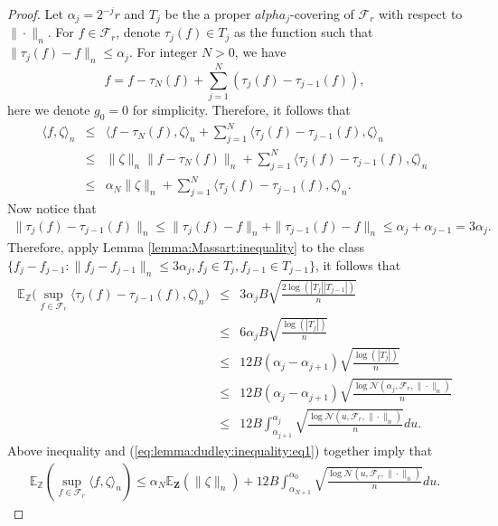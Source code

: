 \documentclass[11pt, preprint]{imsart}
\numberwithin{equation}{section}
\def \mcF{\mathcal{F}}
\def \mcN{\mathcal{N}}
\def \bfZ{\mathbf{Z}}
\def \ev{\mathbb{E}}
\theoremstyle{plain}
\theoremstyle{definition}
\begin{document}
\begin{proof}
Let $\alpha_j=2^{-j}r$ and $T_j$ be the a proper $alpha_j$-covering of $\mcF_r$ with respect to $\|\cdot\|_n$. For $f\in \mcF_r$, denote $\tau_j(f)\in T_j$ as the function such that $\|\tau_j(f)-f\|_n\leq \alpha_j$. For integer $N>0$, we have
\begin{equation*}
	f=f-\tau_N(f)+\sum_{j=1}^N(\tau_j(f)-\tau_{j-1}(f)),
\end{equation*}
here we denote $g_0=0$ for simplicity. Therefore, it follows that
\begin{eqnarray}
	\langle f, \zeta \rangle_n&\leq&	\langle f-\tau_N(f), \zeta \rangle_n+\sum_{j=1}^N \langle \tau_j(f)-\tau_{j-1}(f), \zeta \rangle_n\nonumber\\
	&\leq& \|\zeta\|_n \|f-\tau_N(f)\|_n+\sum_{j=1}^N \langle \tau_j(f)-\tau_{j-1}(f), \zeta \rangle_n\nonumber\\
	&\leq&  \alpha_N\|\zeta\|_n+\sum_{j=1}^N \langle \tau_j(f)-\tau_{j-1}(f), \zeta \rangle_n. \label{eq:lemma:dudley:inequality:eq1}
\end{eqnarray}
Now notice that
\begin{eqnarray*}
	\|\tau_j(f)-\tau_{j-1}(f)\|_n\leq \|\tau_j(f)-f\|_n+\|\tau_{j-1}(f)-f\|_n\leq \alpha_j+\alpha_{j-1}= 3\alpha_j.
\end{eqnarray*}
Therefore, apply  Lemma \ref{lemma:Massart:inequality} to the class $\{f_j-f_{j-1}: \|f_j-f_{j-1}\|_n\leq 3\alpha_j, f_j\in T_j, f_{j-1}\in T_{j-1}\}$, it follows that
\begin{eqnarray}
	\ev_{\mathbb{Z}}\bigg(\sup_{f\in \mcF_r}\langle \tau_j(f)-\tau_{j-1}(f), \zeta \rangle_n\bigg)&\leq&   3\alpha_j B\sqrt{\frac{2\log(|T_j||T_{j-1}|)}{n}}\nonumber\\
	&\leq& 6\alpha_j B\sqrt{\frac{\log(|T_j|)}{n}}\nonumber\\
	&\leq& 12B(\alpha_j-\alpha_{j+1})\sqrt{\frac{\log(|T_j|)}{n}}\nonumber\\
	&\leq& 12B(\alpha_j-\alpha_{j+1})\sqrt{\frac{\log \mcN(\alpha_j, \mcF_r, \|\cdot\|_n)}{n}}\nonumber\\
	&\leq&12B\int_{\alpha_{j+1}}^{\alpha_j}\sqrt{\frac{\log \mcN(u, \mcF_r, \|\cdot\|_n)}{n}}du.\nonumber
\end{eqnarray}
Above inequality and (\ref{eq:lemma:dudley:inequality:eq1}) together imply that
\begin{eqnarray}
	\ev_{\mathbb{Z}}(\sup_{f\in \mcF_r}\langle f, \zeta \rangle_n)\leq \alpha_N\ev_\bfZ(\|\zeta\|_n)+12B\int_{\alpha_{N+1}}^{\alpha_0}\sqrt{\frac{\log \mcN(u, \mcF_r, \|\cdot\|_n)}{n}}du.\nonumber

\end{eqnarray}
\end{proof}
\end{document}
